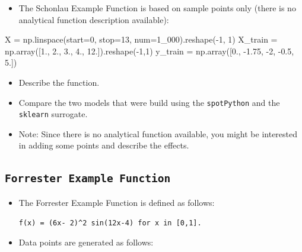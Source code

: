 \documentclass[
  letterpaper,
  DIV=11,
  numbers=noendperiod]{scrreprt}
\newenvironment{Shaded}{\begin{snugshade}}{\end{snugshade}}
\newcommand{\DecValTok}[1]{\textcolor[rgb]{0.68,0.00,0.00}{#1}}
\newcommand{\FloatTok}[1]{\textcolor[rgb]{0.68,0.00,0.00}{#1}}
\newcommand{\NormalTok}[1]{\textcolor[rgb]{0.00,0.23,0.31}{#1}}
\newcommand{\OperatorTok}[1]{\textcolor[rgb]{0.37,0.37,0.37}{#1}}
\providecommand{\tightlist}{%
  \setlength{\itemsep}{0pt}\setlength{\parskip}{0pt}}\usepackage{longtable,booktabs,array}
\begin{document}
\begin{itemize}
\tightlist
\item
  The Schonlau Example Function is based on sample points only (there is
  no analytical function description available):
\end{itemize}

\begin{Shaded}
\begin{Highlighting}[]
\NormalTok{X }\OperatorTok{=}\NormalTok{ np.linspace(start}\OperatorTok{=}\DecValTok{0}\NormalTok{, stop}\OperatorTok{=}\DecValTok{13}\NormalTok{, num}\OperatorTok{=}\DecValTok{1\_000}\NormalTok{).reshape(}\OperatorTok{{-}}\DecValTok{1}\NormalTok{, }\DecValTok{1}\NormalTok{)}
\NormalTok{X\_train }\OperatorTok{=}\NormalTok{ np.array([}\FloatTok{1.}\NormalTok{, }\FloatTok{2.}\NormalTok{, }\FloatTok{3.}\NormalTok{, }\FloatTok{4.}\NormalTok{, }\FloatTok{12.}\NormalTok{]).reshape(}\OperatorTok{{-}}\DecValTok{1}\NormalTok{,}\DecValTok{1}\NormalTok{)}
\NormalTok{y\_train }\OperatorTok{=}\NormalTok{ np.array([}\FloatTok{0.}\NormalTok{, }\OperatorTok{{-}}\FloatTok{1.75}\NormalTok{, }\OperatorTok{{-}}\DecValTok{2}\NormalTok{, }\OperatorTok{{-}}\FloatTok{0.5}\NormalTok{, }\FloatTok{5.}\NormalTok{])}
\end{Highlighting}
\end{Shaded}

\begin{itemize}
\tightlist
\item
  Describe the function.
\item
  Compare the two models that were build using the \texttt{spotPython}
  and the \texttt{sklearn} surrogate.
\item
  Note: Since there is no analytical function available, you might be
  interested in adding some points and describe the effects.
\end{itemize}

\hypertarget{forrester-example-function}{%
\subsection{\texorpdfstring{\texttt{Forrester\ Example\ Function}}{Forrester Example Function}}\label{forrester-example-function}}

\begin{itemize}
\item
  The Forrester Example Function is defined as follows:

  \texttt{f(x)\ =\ (6x-\ 2)\^{}2\ sin(12x-4)\ for\ x\ in\ {[}0,1{]}.}
\item
  Data points are generated as follows:
\end{itemize}
\end{document}
